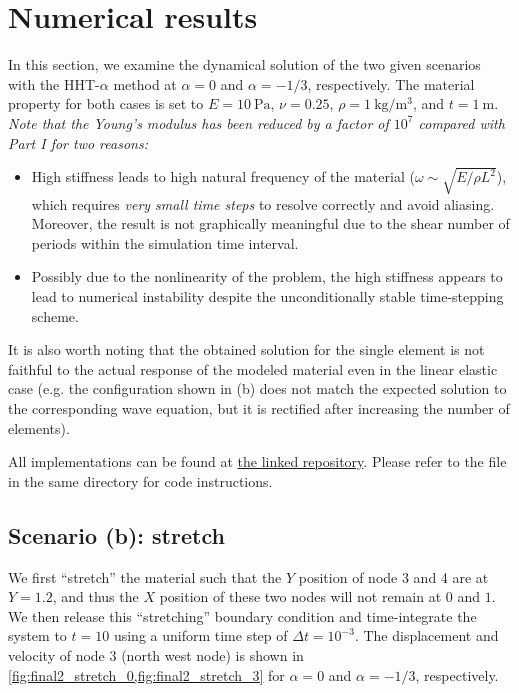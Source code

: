 \section{Numerical results}

In this section, we examine the dynamical solution of the two given scenarios with the HHT-$\alpha$ method at $\alpha=0$ and $\alpha = -1/3$, respectively. 
The material property for both cases is set to $E = \qty{10}{\pascal}$, $\nu = 0.25$, $\rho = \qty{1}{\kg\per\m\cubed}$, and $t = \qty{1}{\m}$.
\emph{Note that the Young's modulus has been reduced by a factor of $10^7$ compared with Part I for two reasons: }
\begin{itemize}
    \item {
        High stiffness leads to high natural frequency of the material ($\omega \sim \sqrt{E / \rho L^2}$), which requires \emph{very small time steps} to resolve correctly and avoid aliasing. 
        Moreover, the result is not graphically meaningful due to the shear number of periods within the simulation time interval.
    }
    \item {
        Possibly due to the nonlinearity of the problem, the high stiffness appears to lead to numerical instability despite the unconditionally stable time-stepping scheme.
    }
\end{itemize}
It is also worth noting that the obtained solution for the single element is not faithful to the actual response of the modeled material even in the linear elastic case (e.g. the configuration shown in (b) does not match the expected solution to the corresponding wave equation, but it is rectified after increasing the number of elements). 

All implementations can be found at \href{https://github.com/sy-cui/CSE552-FA2024/tree/main/final/part2}{the linked repository}.
Please refer to the  file in the same directory for code instructions. 

\subsection{Scenario (b): stretch}

We first ``stretch'' the material such that the $Y$ position of node 3 and 4 are at $Y = 1.2$, and thus the $X$ position of these two nodes will not remain at $0$ and $1$. 
We then release this ``stretching'' boundary condition and time-integrate the system to $t = 10$ using a uniform time step of $\Delta t = 10^{-3}$.
The displacement and velocity of node 3 (north west node) is shown in \cref{fig:final2_stretch_0,fig:final2_stretch_3} for $\alpha = 0$ and $\alpha = -1/3$, respectively.

